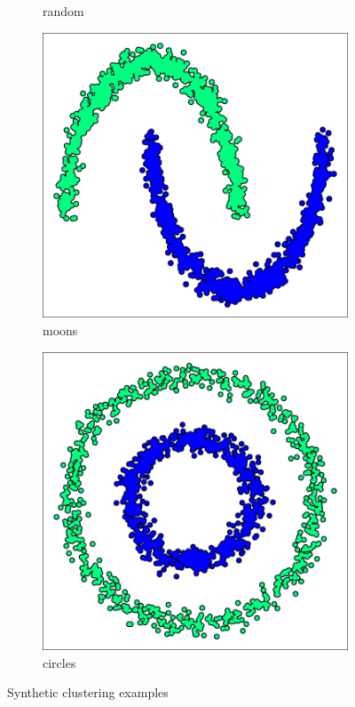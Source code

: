 \begin{figure}
\begin{subfigure}[b]{0.22\textwidth}
		\caption{random}
	\end{subfigure}
	\hspace*{0.015\textwidth}	
	\begin{subfigure}[b]{0.22\textwidth}
		\centering
		\includegraphics[height=\textwidth]{pix/noisy_moons_color_3600.pdf}
		\caption{moons}
	\end{subfigure}
	\hspace*{0.035\textwidth}	
	\begin{subfigure}[b]{0.22\textwidth}
		\centering
		\includegraphics[height=\textwidth]{pix/noisy_circles_color_3600.pdf}
		\caption{circles}
	\end{subfigure}    
\caption{Synthetic clustering examples}\label{fig:clusterexamples}
\end{figure}
